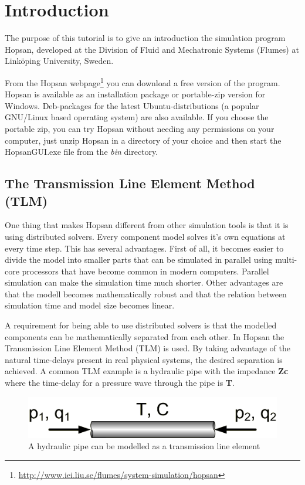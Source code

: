 \documentclass[a4paper,pdftex]{article}
\begin{document}

\section*{Introduction}
The purpose of this tutorial is to give an introduction the simulation program Hopsan, developed at the Division of Fluid and Mechatronic Systems (Flumes) at Linköping University, Sweden.

From the Hopsan webpage\footnote{\url{http://www.iei.liu.se/flumes/system-simulation/hopsan}} you can download a free version of the program.
Hopsan is available as an installation package or portable-zip version for Windows.
Deb-packages for the latest Ubuntu-distributions (a popular GNU/Linux based operating system) are also available.
If you choose the portable zip, you can try Hopsan without needing any permissions on your computer, just unzip Hopsan in a directory of your choice and then start the HopsanGUI.exe file from the \textit{bin} directory.

\subsection*{The Transmission Line Element Method (TLM)}
One thing that makes Hopsan different from other simulation tools is that it is using distributed solvers.
Every component model solves it's own equations at every time step.
This has several advantages. 
First of all, it becomes easier to divide the model into smaller parts that can be simulated in parallel using multi-core processors that have become common in modern computers.
Parallel simulation can make the simulation time much shorter.
Other advantages are that the modell becomes mathematically robust and that the relation between simulation time and model size becomes linear.

A requirement for being able to use distributed solvers is that the modelled components can be mathematically separated from each other. 
In Hopsan the Transmission Line Element Method (TLM) is used.
By taking advantage of the natural time-delays present in real physical systems, the desired separation is achieved.
A common TLM example is a hydraulic pipe with the impedance \textbf{Zc} where the time-delay for a pressure wave through the pipe is \textbf{T}.

\begin{figure}[hbt]
  \centering
  \includegraphics[width=0.6\linewidth]{gfx/PosterTransmissionLines.png}
  \caption{A hydraulic pipe can be modelled as a transmission line element}
  \label{fig:hydraulic_pipe}
\end{figure}
\end{document}
